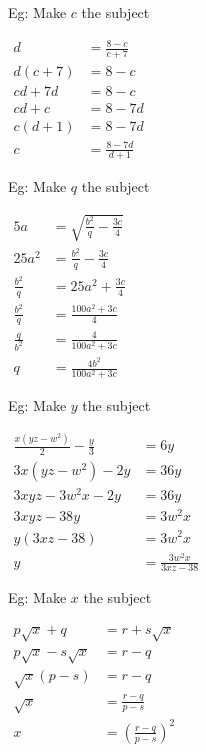 \documentclass[twocolumn]{article}
\begin{document}
\bigskip 

\noindent 
Eg: Make $c$ the subject

\noindent 
$\begin{aligned} d & =\frac{8-c}{c+7} \\ d(c+7) & =8-c \\ c d+7 d & =8-c \\ c d+c & =8-7 d \\ c(d+1) & =8-7 d \\ c & =\frac{8-7 d}{d+1}\end{aligned}$

\bigskip 

\bigskip 

\bigskip 

\bigskip 

\bigskip 

\bigskip 

\bigskip 

\bigskip 

\bigskip 

\noindent 
Eg: Make $q$ the subject

\noindent 
$\begin{aligned} 5 a & =\sqrt{\frac{b^2}{q}-\frac{3 c}{4}} \\ 25 a^2 & =\frac{b^2}{q}-\frac{3 c}{4} \\ \frac{b^2}{q} & =25 a^2+\frac{3 c}{4} \\ \frac{b^2}{q} & =\frac{100 a^2+3 c}{4} \\ \frac{q}{b^2} & =\frac{4}{100 a^2+3 c} \\ q & =\frac{4 b^2}{100 a^2+3 c}\end{aligned}$

\bigskip 

\noindent 
Eg: Make $y$ the subject

\noindent 
$\begin{aligned} \frac{x\left(y z-w^2\right)}{2}-\frac{y}{3} & =6 y \\ 3 x\left(y z-w^2\right)-2 y & =36 y \\ 3 x y z-3 w^2 x-2 y & =36 y \\ 3 x y z-38 y & =3 w^2 x \\ y(3 x z-38) & =3 w^2 x \\ y & =\frac{3 w^2 x}{3 x z-38}\end{aligned}$

\bigskip 

\noindent 
Eg: Make $x$ the subject

\noindent 
$\begin{aligned} p \sqrt{x}+q & =r+s \sqrt{x} \\ p \sqrt{x}-s \sqrt{x} & =r-q \\ \sqrt{x}(p-s) & =r-q \\ \sqrt{x} & =\frac{r-q}{p-s} \\ x & =\left(\frac{r-q}{p-s}\right)^2\end{aligned}$
\end{document}
